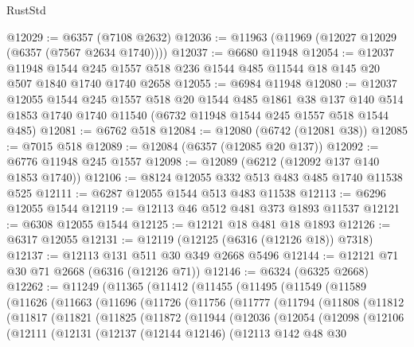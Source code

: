 \begin{lexlean}{RustStd}
\begin{coremodule}
@12029 := @6357 (@7108 @2632)
@12036 := @11963 (@11969 (@12027 @12029 (@6357 (@7567 @2634 @1740))))
@12037 := @6680 @11948
@12054 := @12037
    @11948
    @1544
    @245
    @1557
    @518
    @236
    @1544
    @485
    @11544
    @18
    @145
    @20
    @507
    @1840
    @1740
    @1740
    @2658
@12055 := @6984 @11948
@12080 := @12037
    @12055
    @1544
    @245
    @1557
    @518
    @20
    @1544
    @485
    @1861
    @38
    @137
    @140
    @514
    @1853
    @1740
    @1740
    @11540
    (@6732 @11948 @1544 @245 @1557 @518 @1544 @485)
@12081 := @6762 @518
@12084 := @12080 (@6742 (@12081 @38))
@12085 := @7015 @518
@12089 := @12084 (@6357 (@12085 @20 @137))
@12092 := @6776 @11948 @245 @1557
@12098 := @12089 (@6212 (@12092 @137 @140 @1853 @1740))
@12106 := @8124 @12055 @332 @513 @483 @485 @1740 @11538 @525
@12111 := @6287 @12055 @1544 @513 @483 @11538
@12113 := @6296 @12055 @1544
@12119 := @12113 @46 @512 @481 @373 @1893 @11537
@12121 := @6308 @12055 @1544
@12125 := @12121 @18 @481 @18 @1893
@12126 := @6317 @12055
@12131 := @12119 (@12125 (@6316 (@12126 @18)) @7318)
@12137 := @12113 @131 @511 @30 @349 @2668 @5496
@12144 := @12121 @71 @30 @71 @2668 (@6316 (@12126 @71))
@12146 := @6324 (@6325 @2668)
@12262 := @11249
    (@11365
      (@11412
        (@11455
          (@11495
            (@11549
              (@11589
                (@11626
                  (@11663
                    (@11696
                      (@11726
                        (@11756
                          (@11777
                            (@11794
                              (@11808
                                (@11812
                                  (@11817
                                    (@11821
                                      (@11825
                                        (@11872
                                          (@11944
                                            (@12036
                                              (@12054
                                                (@12098
                                                  (@12106
                                                    (@12111
                                                      (@12131
                                                        (@12137
                                                          (@12144 @12146)
                                                          (@12113
                                                            @142
                                                            @48
                                                            @30

\end{coremodule}
\end{lexlean}
